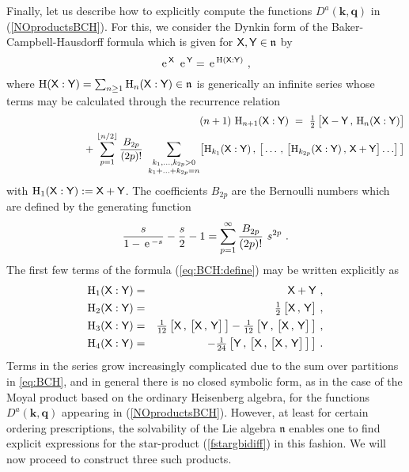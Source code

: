 \documentclass[11pt,a4paper]{article}
\newcommand{\cb}[2]{\bigl[#1\,,\,#2\bigr]}                 %
\newcommand{\1}{\mathbb{1}}
\newcommand{\mbf}[1]{{\boldsymbol {#1} }}
\def\X{{\sf X}}
\def\Y{{\sf Y}}
\def\mk{{\mbf k}}
\def\mq{{\mbf q}}
\def\mfn{{\mathfrak n}}
\def\e{{\,\rm e}\,}
\begin{document}
Finally, let us describe how to explicitly compute the functions
$D^a(\mk,\mq)$ in (\ref{NOproductsBCH}). For this, we consider the
Dynkin form of the Baker-Campbell-Hausdorff formula which is given for
$\X,\Y\in\mfn$ by
\begin{equation}
  \label{eq:BCH:define}
\e^\X~\e^\Y=\e^{\mathrm{H}(\X:\Y)} \ ,
\end{equation}
where $\mathrm{H}(\X:\Y)=\sum_{n\geq1}\mathrm{H}_n(\X:\Y)\in\mfn$ is
generically an infinite series whose terms may be calculated through the
recurrence relation
\begin{eqnarray}
  \label{eq:BCH}
&&(n+1)~\mathrm{H}_{n+1}(\X:\Y)~=~\mbox{$\frac 12$}\,\bigl[\X-\Y\,,\,
\mathrm{H}_n(\X:\Y)\bigr]
\nonumber  \\ &&~~~~~~~~~~~~~~~~~~~~
+\,\sum_{p=1}^{\lfloor n/2\rfloor}\frac{B_{2p}}{(2p)!}~
\sum_{\substack{k_1,\ldots,k_{2p}> 0 \\ k_1+\ldots+k_{2p}=n }}
\bigl[\mathrm{H}_{k_1}(\X:\Y)\,,\,\bigl[\,\ldots\,,\,\bigl[
\mathrm{H}_{k_{2p}}(\X:\Y)\,,\,\X+\Y\bigr]\ldots\bigr]\,\bigr]\nonumber\\
\end{eqnarray}
with $\mathrm{H}_1(\X:\Y):=\X+\Y$. The coefficients $B_{2p}$ are the
Bernoulli numbers which are defined by the generating function
\begin{equation}
  \label{eq:BCH:K}
  \frac{s}{1-\e^{-s}}-\frac s2-1=\sum_{p=1}^\infty\frac{B_{2p}}{(2p)!}
  ~s^{2p} \ .
\end{equation}
The first few terms of the formula (\ref{eq:BCH:define}) may be
written explicitly as
\begin{eqnarray}
  \label{eq:BCH:1}
  \mathrm{H}_1(\X:\Y)&=& \X+\Y \ , \nonumber\\
  \mathrm{H}_2(\X:\Y)&=&\mbox{$\frac 12$}\,\cb \X\Y \ , \nonumber \\
  \mathrm{H}_3(\X:\Y)&=&\mbox{$\frac 1{12}$}\,\bigl[\X\,,\,\cb \X\Y\,\bigr]
  -\mbox{$\frac 1{12}$}\,\bigl[\Y\,,\,\cb \X\Y\,\bigr] \ , \nonumber\\
  \mathrm{H}_4(\X:\Y)&=& -\mbox{$\frac 1{24}$}\,\bigl[\Y\,,\,\bigl[\X
  \,,\,\cb \X\Y\,\bigr]\,\bigr] \ .
\end{eqnarray}
Terms in the series grow increasingly complicated due to
the sum over partitions in \eqref{eq:BCH}, and in general there is no
closed symbolic form, as in the case of the Moyal product based on the
ordinary Heisenberg algebra, for the functions $D^a(\mk,\mq)$ appearing in
(\ref{NOproductsBCH}). However, at least for certain ordering
prescriptions, the solvability of the Lie algebra $\mfn$ enables one
to find explicit expressions for the star-product (\ref{fstargbidiff})
in this fashion. We will now proceed to construct three such
products.
\end{document}
